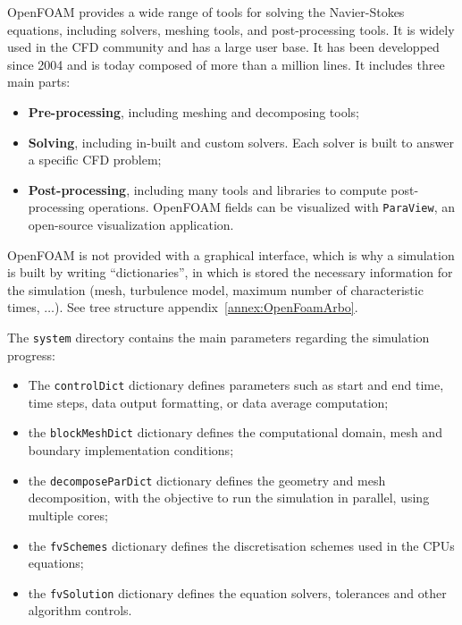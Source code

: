 OpenFOAM provides a wide range of tools for solving the Navier-Stokes equations, including solvers, meshing tools, and post-processing tools. It is widely used in the CFD community and has a large user base. It has been developped since 2004 and is today composed of more than a million lines. It includes three main parts:

\begin{itemize}
    \item[$-$] \textbf{Pre-processing}, including meshing and decomposing tools;
    \item[$-$] \textbf{Solving}, including in-built and custom solvers. Each solver is built to answer a specific CFD problem;
    \item[$-$] \textbf{Post-processing}, including many tools and libraries to compute post-processing operations. OpenFOAM fields can be visualized with \texttt{ParaView}, an open-source visualization application.
\end{itemize}

OpenFOAM is not provided with a graphical interface, which is why a simulation is built by writing ``dictionaries'', in which is stored the necessary information for the simulation (mesh, turbulence model, maximum number of characteristic times, $\dots$). See tree structure appendix~\ref{annex:OpenFoamArbo}.





The \texttt{system} directory contains the main parameters regarding the simulation progress:
\begin{itemize}
    \item[$-$] The \texttt{controlDict} dictionary defines parameters such as start and end time, time steps, data output formatting, or data average computation;
    \item[$-$] the \texttt{blockMeshDict} dictionary defines the computational domain, mesh and boundary implementation conditions;
    \item[$-$] the \texttt{decomposeParDict} dictionary defines the geometry and mesh decomposition, with the objective to run the simulation in parallel, using multiple cores;
    \item[$-$] the \texttt{fvSchemes} dictionary defines the discretisation schemes used in the \ac{CPU}s equations;
    \item[$-$] the \texttt{fvSolution} dictionary defines the equation solvers, tolerances and other algorithm controls.
\end{itemize}

